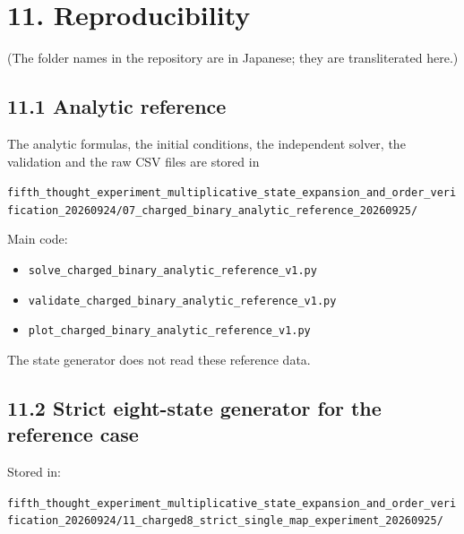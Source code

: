 \documentclass[
  a4paper,
]{article}
\providecommand{\tightlist}{%
  \setlength{\itemsep}{0pt}\setlength{\parskip}{0pt}}
\begin{document}
\section{11. Reproducibility}\label{reproducibility}

(The folder names in the repository are in Japanese; they are
transliterated here.)

\subsection{11.1 Analytic reference}\label{analytic-reference}

The analytic formulas, the initial conditions, the independent solver,
the validation and the raw CSV files are stored in

\texttt{fifth\_\allowbreak{}thought\_\allowbreak{}experiment\_\allowbreak{}multiplicative\_\allowbreak{}state\_\allowbreak{}expansion\_\allowbreak{}and\_\allowbreak{}order\_\allowbreak{}verification\_\allowbreak{}20260924/\allowbreak{}07\_\allowbreak{}charged\_\allowbreak{}binary\_\allowbreak{}analytic\_\allowbreak{}reference\_\allowbreak{}20260925/\allowbreak{}}

Main code:

\begin{itemize}
\tightlist
\item
  \texttt{solve\_charged\_binary\_analytic\_reference\_v1.py}
\item
  \texttt{validate\_charged\_binary\_analytic\_reference\_v1.py}
\item
  \texttt{plot\_charged\_binary\_analytic\_reference\_v1.py}
\end{itemize}

The state generator does not read these reference data.

\subsection{11.2 Strict eight-state generator for the reference
case}\label{strict-eight-state-generator-for-the-reference-case}

Stored in:

\texttt{fifth\_\allowbreak{}thought\_\allowbreak{}experiment\_\allowbreak{}multiplicative\_\allowbreak{}state\_\allowbreak{}expansion\_\allowbreak{}and\_\allowbreak{}order\_\allowbreak{}verification\_\allowbreak{}20260924/\allowbreak{}11\_\allowbreak{}charged8\_\allowbreak{}strict\_\allowbreak{}single\_\allowbreak{}map\_\allowbreak{}experiment\_\allowbreak{}20260925/\allowbreak{}}
\end{document}
